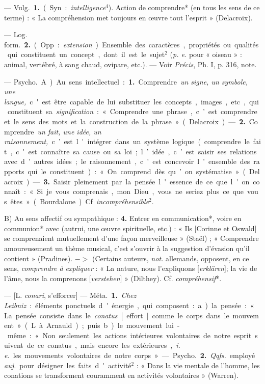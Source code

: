 \begin{itemize}[leftmargin=1cm, label=, itemsep=11pt]
 — \si{Vulg.} {\bf 1.} (Syn. :
{\it intelligence}$^4$). Action de comprendre*
(en tous les sens de ce terme) : « La
compréhension met toujours en
œuvre tout l'esprit » (Delacroix).

— \si{Log. form.} {\bf 2.} (Opp. : {\it extension}). Ensemble des caractères, propriétés ou qualités qui constituent
un concept, dont il est le sujet$^2$
({\it p. e.} pour « oiseau » : animal, vertébré, à sang chaud, ovipare, etc.).
— Voir {\it Précis}, Ph. I, p. 316, note.

 — \si{Psycho.} A) Au sens
intellectuel : {\bf 1.} Comprendre {\it un
signe, un symbole, une langue,} c'est
être capable de lui substituer les
concepts, images, etc., qui constituent sa {\it signification} : « Comprendre
une phrase, c’est comprendre et le
sens des mots et la construction de
la phrase » (Delacroix). — {\bf 2.} Comprendre
{\it un fait, une idée, un raisonnement,} c’est l'intégrer dans un système logique (comprendre le fait,
c'est connaître sa cause ou sa loi;
l’idée, c’est saisir ses relations avec
d’autres idées; le raisonnement,
c'est concevoir l’ensemble des rapports qui le constituent) : « On comprend dès qu’on systématise » (Delacroix). — {\bf 3.} Saisir pleinement par
la pensée l'essence de ce que l'on
connaît : « Si je vous comprenais,
mon Dieu, vous ne seriez plus ce que
vous êtes » (Bourdaloue). Cf. {\it incompréhensible}$^2$.

B) Au sens affectif ou sympathique : {\bf 4.} Entrer en communication*, voire en communion* avec
(autrui, une œuvre spirituelle, etc.) :
« Ils [Corinne et Oswald] se comprenaient mutuellement d’une façon
merveilleuse » (Staël) ; « Comprendre
amoureusement un thème musical,
c'est s'ouvrir à la suggestion d'évasion qu'il contient » (Pradines).
$->$ (Certains auteurs, {\it not.} allemands, opposent, en ce sens, {\it comprendre à expliquer} : « La nature,
nous l'expliquons [{\it erklären}]; la vie
de l'âme, nous la comprenons [{\it verstehen}] » (Dilthey). Cf. {\it compréhensif}*.

 — [L. {\it conari}, s’efforcer] — \si{Méta.} {\bf 1.} {\it Chez Leibniz} : éléments ponctuels d'énergie, qui composent : a) la pensée : « La pensée
consiste dans le {\it conatus} [effort]
comme le corps dans le mouvement » (L. à Arnauld); puis b) le
mouvement lui-même : « Non seulement les actions intérieures volontaires de notre esprit suivent de ce
conatus, mais encore les extérieures,
{\it i. e.} les mouvements volontaires de
notre corps ». — \si{Psycho.} {\bf 2.} {\it Qqfs.}
employé {\it auj.} pour désigner les faits
d'activité$^2$ : « Dans la vie mentale de
l'homme, les conations se transforment
couramment en activités volontaires » (Warren).


\end{itemize}
